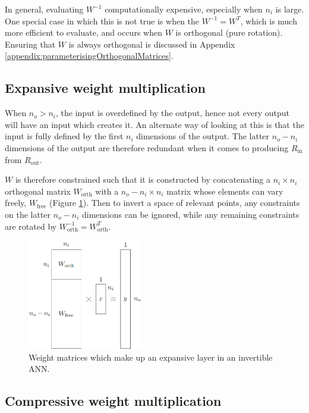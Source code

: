 \documentclass[../../main.tex]{subfiles}
\begin{document}
In general, evaluating $W^{-1}$ computationally expensive, especially when $n_i$ is large.
One special case in which this is not true is when the $W^{-1}=W^T$, which is much more efficient to evaluate, and occurs when $W$ is orthogonal (pure rotation).
Ensuring that $W$ is always orthogonal is discussed in Appendix \ref{appendix:parameterisingOrthogonalMatrices}.

\subsection{Expansive weight multiplication} \label{subsection:expansiveWeightMultiplication}

When $n_o>n_i$, the input is overdefined by the output, hence not every output will have an input which creates it.
An alternate way of looking at this is that the input is fully defined by the first $n_i$ dimensions of the output.
The latter $n_o-n_i$ dimensions of the output are therefore redundant when it comes to producing $R_\text{in}$ from $R_\text{out}$.

$W$ is therefore constrained such that it is constructed by concatenating a $n_i\times n_i$ orthogonal matrix $W_\text{orth}$ with a $n_o-n_i\times n_i$ matrix whose elements can vary freely, $W_\text{free}$ (Figure \ref{fig:expansiveLayer}).
Then to invert a space of relevant points, any constraints on the latter $n_o-n_i$ dimensions can be ignored, while any remaining constraints are rotated by $W_\text{orth}^{-1}=W_\text{orth}^T$.
\begin{figure}[H]
    \begin{center}
    \includegraphics[width=0.45\textwidth]{expansiveLayer}
    \caption{
        Weight matrices which make up an expansive layer in an invertible ANN.
    }
    \label{fig:expansiveLayer}
    \end{center}
\end{figure}

\subsection{Compressive weight multiplication} \label{subsection:compressiveWeightMultiplication}
\end{document}
